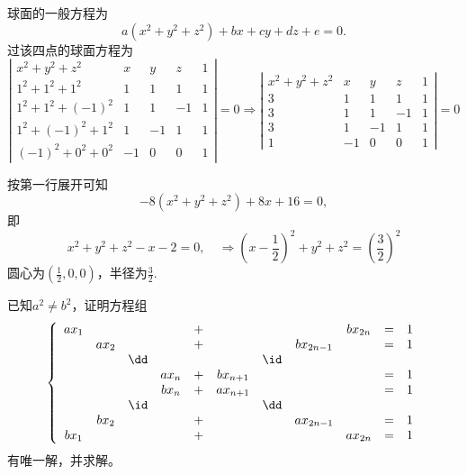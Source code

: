 \begin{jie}
球面的一般方程为
$$
a(x^2+y^2+z^2)+bx+cy+dz+e=0.
$$
过该四点的球面方程为
$$
\left|
\begin{array}{rrrrr}
x^2+y^2+z^2&x&y&z&1\\[0.1cm]
1^2+1^2+1^2&1&1&1&1\\[0.1cm]
1^2+1^2+(-1)^2&1&1&-1&1\\[0.1cm]
1^2+(-1)^2+1^2&1&-1&1&1\\[0.1cm]
(-1)^2+0^2+0^2&-1&0&0&1
\end{array}
\right| = 0 \Rightarrow
\left|
\begin{array}{rrrrr}
x^2+y^2+z^2&x&y&z&1\\[0.1cm]
3&1&1&1&1\\[0.1cm]
3&1&1&-1&1\\[0.1cm]
3&1&-1&1&1\\[0.1cm]
1&-1&0&0&1
\end{array}
\right| = 0
$$

按第一行展开可知
$$
-8(x^2+y^2+z^2) + 8x +16=0,
$$
即
$$
x^2+y^2+z^2-x-2=0, \quad \Rightarrow
(x-\frac12)^2+y^2+z^2=(\frac32)^2
$$
圆心为$(\frac12, 0, 0)$，半径为$\frac32$.
\end{jie}






\begin{li} 
  已知$a^2\ne b^2$，证明方程组
  $$
  \left\{
    \begin{array}{ccccccccccc}
      ax_1&&&&+&&&&bx_{2n}&=&1\\
          &ax_2&&&+&&&bx_{2n-1}&&=&1\\
          &&\dd&&&&\id&&&&\\
          &&&ax_n&+&bx_{n+1}&&&&=&1\\
          &&&bx_n&+&ax_{n+1}&&&&=&1\\
          &&\id&&&&\dd&&&&\\
          &bx_2&&&+&&&ax_{2n-1}&&=&1\\
      bx_1&&&&+&&&&ax_{2n}&=&1\\
    \end{array}
  \right.
  $$
  有唯一解，并求解。
\end{li}

